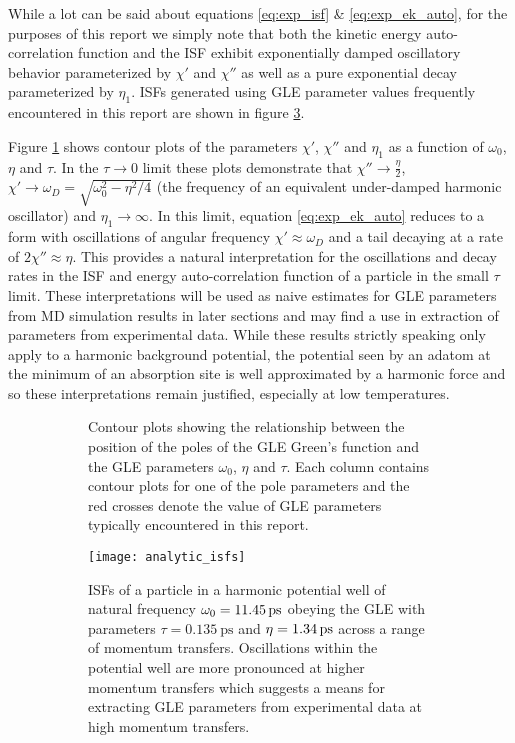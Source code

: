 While a lot can be said about equations \ref{eq:exp_isf} \& \ref{eq:exp_ek_auto}, for the purposes of this report we simply note that both the kinetic energy auto-correlation function and the ISF exhibit exponentially damped oscillatory behavior parameterized by $\chi'$ and $\chi''$ as well as a pure exponential decay parameterized by $\eta_1$. ISFs generated using GLE parameter values frequently encountered in this report are shown in figure \ref{fig:analytic_isfs}.
 
Figure \ref{fig:pole_parameters} shows contour plots of the parameters $\chi'$, $\chi''$ and $\eta_1$ as a function of $\omega_0$, $\eta$ and $\tau$. In the $\tau \rightarrow 0$ limit these plots demonstrate that $\chi'' \rightarrow \frac{\eta}{2}$, $\chi' \rightarrow \omega_D = \sqrt{\omega_0^2 - \eta^2/4}$ (the frequency of an equivalent under-damped harmonic oscillator) and $\eta_1 \rightarrow \infty$. In this limit, equation \ref{eq:exp_ek_auto} reduces to a form with oscillations of angular frequency $\chi' \approx \omega_D$ and a tail decaying at a rate of $2\chi'' \approx \eta$. This provides a natural interpretation for the oscillations and decay rates in the ISF and energy auto-correlation function of a particle in the small $\tau$ limit. These interpretations will be used as naive estimates for GLE parameters from MD simulation results in later sections and may find a use in extraction of parameters from experimental data. While these results strictly speaking only apply to a harmonic background potential, the potential seen by an adatom at the minimum of an absorption site is well approximated by a harmonic force and so these interpretations remain justified, especially at low temperatures.

\begin{figure}
	\begin{subfigure}{1.0\textwidth}
		\caption{Contour plots showing the relationship between the position of the poles of the GLE Green's function and the GLE parameters $\omega_0$, $\eta$ and $\tau$. Each column contains contour plots for one of the pole parameters and the red crosses denote the value of GLE parameters typically encountered in this report.}
		\label{fig:pole_parameters}
	\end{subfigure}

	\begin{subfigure}{1.0\textwidth}
		\texttt{[image: analytic\_isfs]}
		\caption{ISFs of a particle in a harmonic potential well of natural frequency $\omega_0=\SI{11.45}{\ips}$ obeying the GLE with parameters $\tau=\SI{0.135}{\ps}$ and $\eta = \SI{1.34}{\ips}$ across a range of momentum transfers. Oscillations within the potential well are more pronounced at higher momentum transfers which suggests a means for extracting GLE parameters from experimental data at high momentum transfers.}
		\label{fig:analytic_isfs}
	\end{subfigure}

	\caption{}
\end{figure} 
